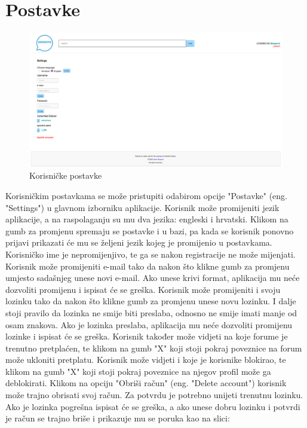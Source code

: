 \documentclass{foi}
\begin{document}
\section{Postavke}

\begin{figure}[h!]
    \centering
    \includegraphics[width=1\textwidth]{slike/postavke.png}
    \caption{Korisničke postavke}
\end{figure}

Korisničkim postavkama se može pristupiti odabirom opcije "Postavke" (eng. "Settings") u glavnom izborniku aplikacije. Korisnik može promijeniti jezik aplikacije, a na raspolaganju su mu dva jezika: engleski i hrvatski. Klikom na gumb za promjenu spremaju se postavke i u bazi, pa kada se korisnik ponovno prijavi prikazati će mu se željeni jezik kojeg je promijenio u postavkama. Korisničko ime je nepromijenjivo, te ga se nakon registracije ne može mijenjati. Korisnik može promijeniti e-mail tako da nakon što klikne gumb za promjenu umjesto sadašnjeg unese novi e-mail. Ako unese krivi format, aplikacija mu neće dozvoliti promijenu i ispisat će se greška. Korisnik može promijeniti i svoju lozinku tako da nakon što klikne gumb za promjenu unese novu lozinku. I dalje stoji pravilo da lozinka ne smije biti preslaba, odnosno ne smije imati manje od osam znakova. Ako je lozinka preslaba, aplikacija mu neće dozvoliti promijenu lozinke i ispisat će se greška. Korisnik također može vidjeti na koje forume je trenutno pretplaćen, te klikom na gumb "X" koji stoji pokraj poveznice na forum može ukloniti pretplatu. Korisnik može vidjeti i koje je korisnike blokirao, te klikom na gumb "X" koji stoji pokraj poveznice na njegov profil može ga deblokirati. Klikom na opciju "Obriši račun" (eng. "Delete account") korisnik može trajno obrisati svoj račun. Za potvrdu je potrebno unijeti trenutnu lozinku. Ako je lozinka pogrešna ispisat će se greška, a ako unese dobru lozinku i potvrdi je račun se trajno briše i prikazuje mu se poruka kao na slici:
\end{document}
